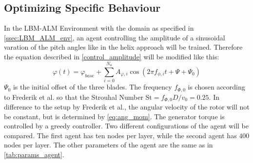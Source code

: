 \subsection{Optimizing Specific Behaviour}
\label{ssec:dyn_description}
In the LBM-ALM Environment with the domain as specified in \autoref{ssec:LBM_ALM_env}, an agent controlling the amplitude of a sinusoidal varation of the pitch angles like in the helix approach will be trained. Therefore the equation described in \eqref{control_amplitude} will be modified like this:
\begin{equation}
	\varphi(t) = \varphi_{base} + \sum^{N_a}_{i=0} A_{\varphi,i} \cos(2 \pi f_{\phi,i} t + \Psi + \Psi_0)
\end{equation} 
$\Psi_0$ is the initial offset of the three blades. The frequency $f_{\Phi,0}$ is chosen according to Frederik et al. so that the Strouhal Number $\mathrm{St} = f_{\Phi, 0} D/v_0 = 0.25$. In difference to the setup by Frederik et al., the angular velocity of the rotor will not be constant, but is determined by \eqref{eq:ang_mom}. The generator torque is controlled by a greedy controller. Two different configurations of the agent will be compared. The first agent has ten nodes per layer, while the second agent has $400$ nodes per layer. The other parameters of the agent are the same as in \autoref{tab:params_agent}.
